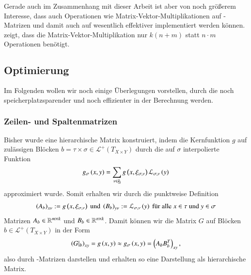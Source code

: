     Gerade auch im Zusammenhang mit dieser Arbeit ist aber von noch größerem Interesse, dass auch Operationen wie Matrix-Vektor-Multiplikationen auf \Rk-Matrizen und damit auch auf \hmat wesentlich 
    effektiver implementiert werden können. \citet{h2diss} zeigt, dass die Matrix-Vektor-Multiplikation nur $k\left(n+m\right)$ statt $n \cdot m$ Operationen benötigt.
    
    
    \subsection{Optimierung}
    \label{sec:optimierung}
    Im Folgenden wollen wir noch einige Überlegungen vorstellen, durch die \hmat noch speicherplatzsparender und noch effizienter in der Berechnung werden.
    
    \subsubsection{Zeilen- und Spaltenmatrizen}
    Bisher wurde eine hierarchische Matrix konstruiert, indem die Kernfunktion $g$ auf zulässigen Blöcken $b = \tau \times \sigma \in \mathcal{L}^+\left(T_{X \times Y}\right)$ durch die auf $\sigma$ 
    interpolierte Funktion
    \begin{equation*}
      g_\sigma\left(x, y\right) = \sum_{\nu \in \haken{k}} g\left(x, \xi_\inds{\nu}\right) \lag_\inds{\nu}\left(y\right)
    \end{equation*}
    approximiert wurde. Somit erhalten wir durch die punktweise Definition
    \begin{equation*}
      \left(A_b\right)_{x\nu} := g\left(x, \xi_{\sigma, \nu}\right) \text{ und } \left(B_b\right)_{y\nu} := \mathcal{L}_{\sigma, \nu}\left(y\right) \text{ für alle } x \in \tau \text{ und } y \in \sigma
    \end{equation*}
    Matrizen $A_b \in \mathbb{R}^{m \times k}$ und $B_b \in \mathbb{R}^{n \times k}$. Damit können wir die Matrix $G$ auf Blöcken $b \in \mathcal{L}^+\left(T_{X \times Y}\right)$ in der Form 
    \begin{equation*}
      \left(G|_b\right)_{xy} = g\left(x,y\right) \approx g_\sigma\left(x,y\right) = \left(A_b B_b^T\right)_{xy},
    \end{equation*}
    also durch \Rk-Matrizen darstellen und erhalten so eine Darstellung als hierarchische Matrix. \citep{nichtlokop}
    
